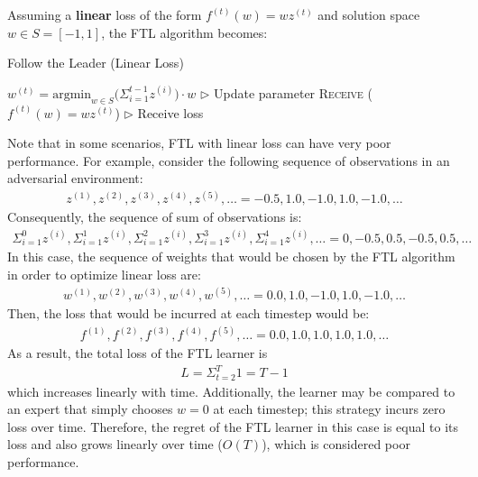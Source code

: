 \documentclass[11pt]{article}
\begin{document}
Assuming a \textbf{linear} loss of the form $f^{(t)}(w)=wz^{(t)}$ and solution space $w \in S = [-1,1]$, the FTL algorithm becomes:
\begin{algorithm}[H]
\caption{Follow the Leader (Linear Loss)}
\label{algo:FTL_linear}
\begin{algorithmic}[1]
\STATE $w^{(t)} = \text{argmin}_{w \in S} \Big(\Sigma_{i=1}^{t-1} {z}^{(i)} \Big) \cdot w$ \hfill $\triangleright$ Update parameter
\STATE \textsc{Receive} ($f^{(t)}(w)=wz^{(t)}$) \hfill $\triangleright$ Receive loss
\ENDFOR
\end{algorithmic}
\end{algorithm}

Note that in some scenarios, FTL with linear loss can have very poor performance. For example, consider the following sequence of observations in an adversarial environment:
\begin{align}
    z^{(1)}, z^{(2)}, z^{(3)},z^{(4)},z^{(5)}, \dots = -0.5, 1.0, -1.0, 1.0, -1.0, \dots
\end{align}
Consequently, the sequence of sum of observations is:
\begin{align}
    \Sigma_{i=1}^{0} {z}^{(i)}, \Sigma_{i=1}^{1} {z}^{(i)}, \Sigma_{i=1}^{2} {z}^{(i)}, \Sigma_{i=1}^{3} {z}^{(i)},\Sigma_{i=1}^{4} {z}^{(i)},\dots = 0, -0.5, 0.5, -0.5, 0.5, \dots
\end{align}
In this case, the sequence of weights that would be chosen by the FTL algorithm in order to optimize linear loss are:
\begin{align}
    w^{(1)}, w^{(2)}, w^{(3)},  w^{(4)}, w^{(5)},\dots = 0.0, 1.0, -1.0, 1.0, -1.0, \dots
\end{align}
Then, the loss that would be incurred at each timestep would be:
\begin{align}
    f^{(1)}, f^{(2)}, f^{(3)}, f^{(4)},f^{(5)},\dots = 0.0, 1.0, 1.0, 1.0, 1.0, \dots
\end{align}
As a result, the total loss of the FTL learner is 
\begin{align}
    L = \Sigma_{t=2}^{T} 1 = T-1
\end{align}
which increases linearly with time. Additionally, the learner may be compared to an expert that simply chooses $w=0$ at each timestep; this strategy incurs zero loss over time. Therefore, the regret of the FTL learner in this case is equal to its loss and also grows linearly over time ($O(T)$), which is considered poor performance.
\end{document}
